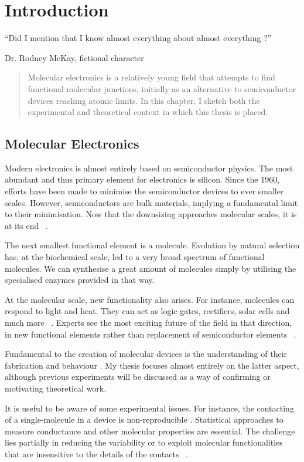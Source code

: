\chapter{Introduction}
\label{ch:chapter_1}
 
\epigraph{
    “Did I mention that I know almost everything about almost everything ?”
}{Dr. Rodney McKay, fictional character}

\begin{abstract}
Molecular electronics is a relatively young field that attempts to find functional molecular junctions, initially as an alternative to semiconductor devices reaching atomic limits. In this chapter, I sketch both the experimental and theoretical context in which this thesis is placed.
\end{abstract}

\newpage
\section{Molecular Electronics}
Modern electronics is almost entirely based on semiconductor physics. The most abundant and thus primary element for electronics is silicon. Since the 1960, efforts have been made to minimise the semiconductor devices to ever smaller scales. However, semiconductors are bulk materials, implying a fundamental limit to their minimisation. Now that the downsizing approaches molecular scales, it is at its end ~\cite{seldenthuis}.

The next smallest functional element is a molecule. Evolution by natural selection has, at the biochemical scale, led to a very broad spectrum of functional molecules. We can synthesise a great amount of molecules simply by utilising the specialised enzymes provided in that way.

At the molecular scale, new functionality also arises. For instance, molecules can respond to light and heat. They can act as logic gates, rectifiers, solar cells and much more ~\cite{perrin}. Experts see the most exciting future of the field in that direction, in new functional elements rather than replacement of semiconductor elements ~\cite{visions}.

Fundamental to the creation of molecular devices is the understanding of their fabrication and behaviour . My thesis focuses almost entirely on the latter aspect, although previous experiments will be discussed as a way of confirming or motivating theoretical work.

It is useful to be aware of some experimental issues. For instance, the contacting of a single-molecule in a device is non-reproducible . Statistical approaches to measure conductance and other molecular properties are essential. The challenge lies partially in reducing the variability or to exploit molecular functionalities that are insensitive to the details of the contacts ~\cite{visions}.

